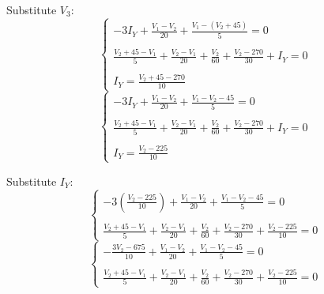 \documentclass{article}
\begin{document}
				Substitute $V_3$:
					\begin{equation*}\begin{cases}
						\displaystyle -3I_Y + \frac{V_1 - V_2}{20} + \frac{V_1 - (V_2 + 45)}{5} = 0 \\ \\
						\displaystyle \frac{V_2 + 45 - V_1}{5} + \frac{V_2 - V_1}{20} + \frac{V_2}{60} + \frac{V_2 - 270}{30} + I_Y = 0 \\ \\
						\displaystyle I_Y = \frac{V_2 + 45 - 270}{10}
					\end{cases}\end{equation*}
					\begin{equation*}\begin{cases}
						\displaystyle -3I_Y + \frac{V_1 - V_2}{20} + \frac{V_1 - V_2 - 45}{5} = 0 \\ \\
						\displaystyle \frac{V_2 + 45 - V_1}{5} + \frac{V_2 - V_1}{20} + \frac{V_2}{60} + \frac{V_2 - 270}{30} + I_Y = 0 \\ \\
						\displaystyle I_Y = \frac{V_2 - 225}{10}
					\end{cases}\end{equation*}

				Substitute $I_Y$:
					\begin{equation*}\begin{cases}
						\displaystyle -3\left(\frac{V_2 - 225}{10}\right) + \frac{V_1 - V_2}{20} + \frac{V_1 - V_2 - 45}{5} = 0 \\ \\
						\displaystyle \frac{V_2 + 45 - V_1}{5} + \frac{V_2 - V_1}{20} + \frac{V_2}{60} + \frac{V_2 - 270}{30} + \frac{V_2 - 225}{10} = 0
					\end{cases}\end{equation*}
					\begin{equation*}\begin{cases}
						\displaystyle -\frac{3V_2 - 675}{10} + \frac{V_1 - V_2}{20} + \frac{V_1 - V_2 - 45}{5} = 0 \\ \\
						\displaystyle \frac{V_2 + 45 - V_1}{5} + \frac{V_2 - V_1}{20} + \frac{V_2}{60} + \frac{V_2 - 270}{30} + \frac{V_2 - 225}{10} = 0
					\end{cases}\end{equation*}
\end{document}
